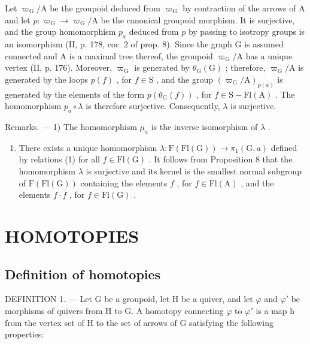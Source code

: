 Let \(\varpi_{\mathrm{G}} / \mathrm{A}\) be the groupoid deduced from \(\varpi_{\mathrm{G}}\) by contraction of the arrows of A and let \(p\colon \varpi_{\mathrm{G}}\to \varpi_{\mathrm{G}} / \mathrm{A}\) be the canonical groupoid morphism. It is surjective, and the group homomorphism \(p_a\) deduced from \(p\) by passing to isotropy groups is an isomorphism (II, p. 178, cor. 2 of prop. 8). Since the graph G is assumed connected and A is a maximal tree thereof, the groupoid \(\varpi_{\mathrm{G}} / \mathrm{A}\) has a unique vertex (II, p. 176). Moreover, \(\varpi_{\mathrm{G}}\) is generated by \(\theta_{\mathrm{G}}(\mathrm{G})\) ; therefore, \(\varpi_{\mathrm{G}} / \mathrm{A}\) is generated by the loops \(p(f)\) , for \(f\in \mathrm{S}\) , and the group \((\varpi_{\mathrm{G}} / \mathrm{A})_{p(a)}\) is generated by the elements of the form \(p(\theta_{\mathrm{G}}(f))\) , for \(f\in \mathrm{S} - \mathrm{Fl}(\mathrm{A})\) . The homomorphism \(p_a\circ \lambda\) is therefore surjective. Consequently, \(\lambda\) is surjective.

Remarks. --- 1) The homomorphism \(\mu_{a}\) is the inverse isomorphism of \(\lambda\) .

\begin{enumerate}
\def\labelenumi{\arabic{enumi})}
\setcounter{enumi}{1}
\tightlist
\item
  There exists a unique homomorphism \(\lambda\colon\mathrm{F}(\mathrm{Fl}(\mathrm{G}))\to\pi_{1}(\mathrm{G},a)\) defined by relations (1) for all \(f\in\mathrm{Fl}(\mathrm{G})\) . It follows from Proposition 8 that the homomorphism \(\lambda\) is surjective and its kernel is the smallest normal subgroup of \(\mathrm{F}(\mathrm{Fl}(\mathrm{G}))\) containing the elements \(f\) , for \(f\in\mathrm{Fl}(\mathrm{A})\) , and the elements \(f\cdot\overline{f}\) , for \(f\in\mathrm{Fl}(\mathrm{G})\) .
\end{enumerate}

\section{HOMOTOPIES}

\subsection{Definition of homotopies}

DEFINITION 1. --- Let G be a groupoid, let H be a quiver, and let \(\varphi\) and \(\varphi'\) be morphisms of quivers from H to G. A homotopy connecting \(\varphi\) to \(\varphi'\) is a map h from the vertex set of H to the set of arrows of G satisfying the following properties:

